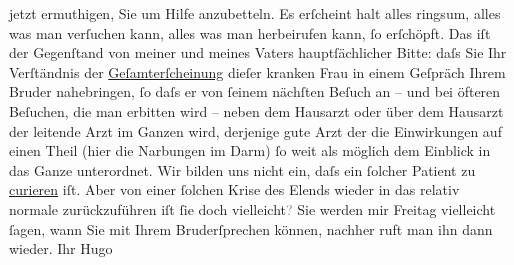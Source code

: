 \begin{ledgroupsized}[t]{13cm}
               jetzt ermuthigen, Sie um Hilfe anzubetteln. Es erſcheint halt alles ringsum, alles
               was man verſuchen kann, alles was man herbeirufen kann, ſo erſchöpft.\pend
           \pstart
           Das iſt der Gegenſtand von meiner und meines Vaters hauptſächlicher Bitte: daſs Sie {\pb}Ihr Verſtändnis der \uline{Geſamterſcheinung} dieſer kranken Frau in einem Geſpräch Ihrem Bruder nahebringen, ſo daſs er von ſeinem
               nächſten Beſuch an – und bei öfteren Beſuchen, die man erbitten wird – neben dem Hausarzt oder über
               dem Hausarzt der
               leitende Arzt im Ganzen wird, derjenige gute Arzt der die Einwirkungen {\pb}auf einen Theil (hier die
               Narbungen im Darm) ſo weit als möglich dem Einblick in das Ganze unterordnet.\pend
           \pstart
           Wir bilden uns nicht ein, daſs ein ſolcher Patient zu \uline{curieren} iſt. Aber von einer ſolchen Krise des Elends wieder in das relativ
               normale zurückzuführen iſt ſie doch vielleicht\textcolor{gray}{?} Sie werden mir
                  Freitag vielleicht ſagen, wann Sie mit Ihrem Bruderſprechen können, nachher ruft man ihn dann wieder.
               Ihr \spacefill\mbox{Hugo}\pend
           \endnumbering{}\end{ledgroupsized}  \newcommand{\dateiname}{L01384}\newcommand{\titel}{Hugo von Hofmannsthal an Arthur Schnitzler, [15. 3. 1904]}\newcommand{\editorInnen}{Martin Anton Müller und Gerd-Hermann Susen}
      